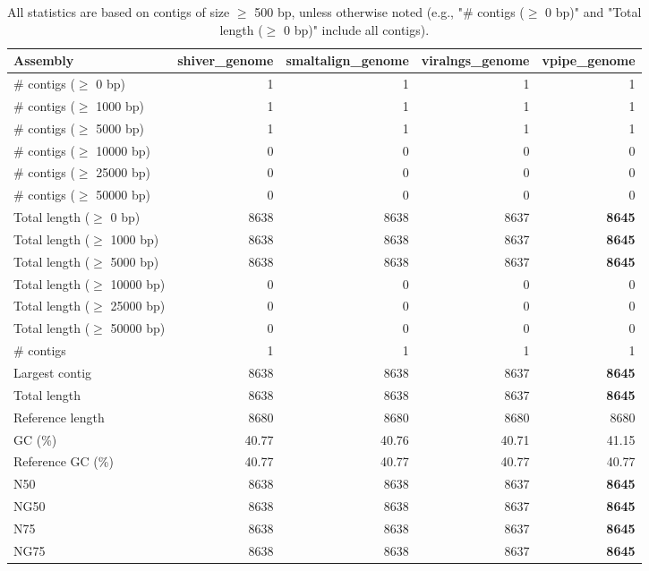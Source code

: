 \documentclass[12pt,a4paper]{article}
\begin{document}
\begin{table}[ht]
\begin{center}
\caption{All statistics are based on contigs of size $\geq$ 500 bp, unless otherwise noted (e.g., "\# contigs ($\geq$ 0 bp)" and "Total length ($\geq$ 0 bp)" include all contigs).}
\begin{tabular}{|l*{4}{|r}|}
\hline
Assembly & shiver\_genome & smaltalign\_genome & viralngs\_genome & vpipe\_genome \\ \hline
\# contigs ($\geq$ 0 bp) & 1 & 1 & 1 & 1 \\ \hline
\# contigs ($\geq$ 1000 bp) & 1 & 1 & 1 & 1 \\ \hline
\# contigs ($\geq$ 5000 bp) & 1 & 1 & 1 & 1 \\ \hline
\# contigs ($\geq$ 10000 bp) & 0 & 0 & 0 & 0 \\ \hline
\# contigs ($\geq$ 25000 bp) & 0 & 0 & 0 & 0 \\ \hline
\# contigs ($\geq$ 50000 bp) & 0 & 0 & 0 & 0 \\ \hline
Total length ($\geq$ 0 bp) & 8638 & 8638 & 8637 & {\bf 8645} \\ \hline
Total length ($\geq$ 1000 bp) & 8638 & 8638 & 8637 & {\bf 8645} \\ \hline
Total length ($\geq$ 5000 bp) & 8638 & 8638 & 8637 & {\bf 8645} \\ \hline
Total length ($\geq$ 10000 bp) & 0 & 0 & 0 & 0 \\ \hline
Total length ($\geq$ 25000 bp) & 0 & 0 & 0 & 0 \\ \hline
Total length ($\geq$ 50000 bp) & 0 & 0 & 0 & 0 \\ \hline
\# contigs & 1 & 1 & 1 & 1 \\ \hline
Largest contig & 8638 & 8638 & 8637 & {\bf 8645} \\ \hline
Total length & 8638 & 8638 & 8637 & {\bf 8645} \\ \hline
Reference length & 8680 & 8680 & 8680 & 8680 \\ \hline
GC (\%) & 40.77 & 40.76 & 40.71 & 41.15 \\ \hline
Reference GC (\%) & 40.77 & 40.77 & 40.77 & 40.77 \\ \hline
N50 & 8638 & 8638 & 8637 & {\bf 8645} \\ \hline
NG50 & 8638 & 8638 & 8637 & {\bf 8645} \\ \hline
N75 & 8638 & 8638 & 8637 & {\bf 8645} \\ \hline
NG75 & 8638 & 8638 & 8637 & {\bf 8645} \\ \hline

\end{tabular}
\end{center}
\end{table}
\end{document}
